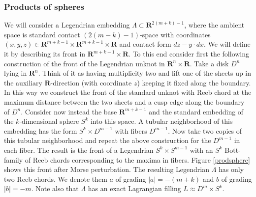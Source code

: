 \documentclass{gtpart}
\renewcommand{\R}{\mathbf{R}}
\begin{document}
\subsubsection{Products of spheres}
We will consider a Legendrian embedding $\Lambda\subset\R^{2(m+k)-1}$, where the ambient space is
standard contact $(2(m-k)-1)$-space with coordinates $(x,y,z)\in\R^{m+k-1}\times\R^{m+k-1}\times\R$
and contact form $dz-y\cdot dx$. We will define it by describing its front in $\R^{m+k-1}\times\R$.
To this end consider first the following construction of the front of the Legendrian unknot in
$\R^{n}\times\R$. Take a disk $D^{n}$ lying in $\R^n$. Think of it as having multiplicity two and
lift one of the sheets up in the auxiliary $\R$-direction (with coordinate $z$) keeping it fixed
along the boundary. In this way we construct the front of the standard unknot with Reeb chord at the maximum distance between the two sheets and a cusp edge along the boundary of $D^{n}$. Consider now instead the base $\R^{m+k-1}$ and the standard embedding of the $k$-dimensional sphere $S^{k}$ into this space. A tubular neighborhood of this embedding has the form $S^{k}\times D^{m-1}$ with fibers $D^{m-1}$. Now take two copies of this tubular neighborhood and repeat the above construction for the $D^{m-1}$ in each fiber. The result is the front of a Legendrian $S^{k}\times S^{m-1}$ with an $S^k$ Bott-family of Reeb chords corresponding to the maxima in fibers. Figure \ref{prodsphere} shows this front after Morse perturbation. The resulting Legendrian $\Lambda$ has only two Reeb chords. We denote them $a$ of grading $|a|=-(m+k)$ and $b$ of grading $|b|=-m$. Note also that $\Lambda$ has an exact Lagrangian filling $L\approx D^{m}\times S^{k}$.
 
\end{document}
